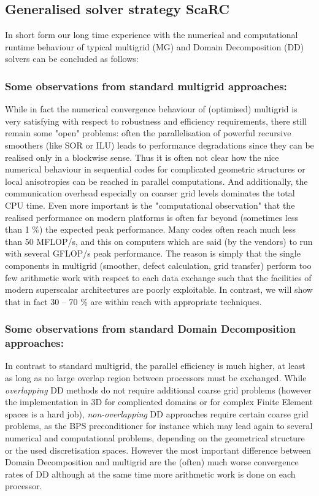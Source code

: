 \subsection{Generalised solver strategy {\sc ScaRC}}

In short form our long time experience with the numerical and computational runtime behaviour of typical 
multigrid (MG) and Domain Decomposition (DD) solvers can be concluded as follows:

\subsubsection{Some observations from standard multigrid approaches:}

While in fact the numerical convergence behaviour of (optimised) multigrid is very satisfying with 
respect to robustness and efficiency requirements, there still remain some "open" problems: often 
the parallelisation of powerful recursive smoothers (like SOR or ILU) leads to performance degradations 
since they can be realised only in a blockwise sense. Thus it is often not clear how the nice 
numerical behaviour in sequential codes for complicated geometric structures or local anisotropies can be 
reached in parallel computations. And additionally, the communication overhead especially on 
coarser grid levels dominates the total CPU time.
Even more important is the "computational observation" that the 
realised performance on modern platforms is often far beyond (sometimes less than 1 \%) the expected 
peak performance. Many codes often reach much less than 50 MFLOP/s, and this on computers which are said 
(by the vendors) to run with several GFLOP/s peak performance. The reason is simply that 
the single components in multigrid (smoother, defect calculation, grid transfer) perform too few 
arithmetic work with respect to each data exchange such that the facilities of modern superscalar 
architectures are poorly exploitable. In contrast,  we will show that in fact 30 -- 70 \% 
are within reach with appropriate techniques.

\subsubsection{Some observations from standard Domain Decomposition approaches:}


In contrast to standard multigrid, the parallel efficiency is much higher, at least as long as 
no large overlap region between processors must be exchanged. While {\em overlapping} DD methods do not require additional coarse grid problems (however the implementation in 3D for complicated domains or 
for complex Finite Element spaces is a hard job), {\em non-overlapping} DD approaches require 
certain coarse grid problems, as the BPS preconditioner for instance which may lead again to several 
numerical and 
computational problems, depending on the geometrical structure or the used discretisation spaces. 
However the most important difference between Domain Decomposition and multigrid are the (often) 
much worse convergence rates of DD although at the same time more arithmetic work is done on 
each processor.


